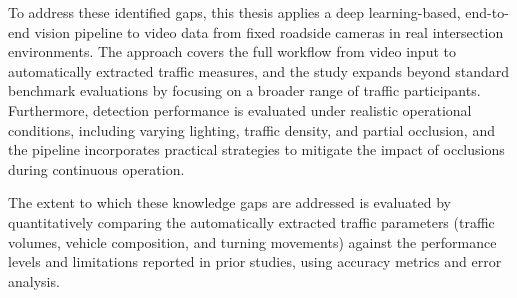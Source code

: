 To address these identified gaps, this thesis applies a deep learning-based, end-to-end vision pipeline to video data from fixed roadside cameras in real intersection environments. The approach covers the full workflow from video input to automatically extracted traffic measures, and the study expands beyond standard benchmark evaluations by focusing on a broader range of traffic participants. Furthermore, detection performance is evaluated under realistic operational conditions, including varying lighting, traffic density, and partial occlusion, and the pipeline incorporates practical strategies to mitigate the impact of occlusions during continuous operation.

The extent to which these knowledge gaps are addressed is evaluated by quantitatively comparing the automatically extracted traffic parameters (traffic volumes, vehicle composition, and turning movements) against the performance levels and limitations reported in prior studies, using accuracy metrics and error analysis. 



